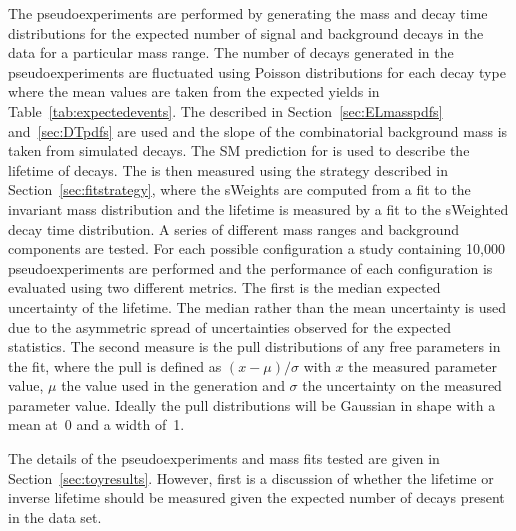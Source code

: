 The pseudoexperiments are performed by generating the mass and decay time distributions for the expected number of signal and background decays in the data for a particular mass range. The number of decays generated in the pseudoexperiments are fluctuated using Poisson distributions for each decay type where the mean values are taken from the expected yields in Table~\ref{tab:expectedevents}. The \pdfs described in Section~\ref{sec:ELmasspdfs} and~\ref{sec:DTpdfs} are used and the slope of the combinatorial background mass \pdf is taken from simulated \bbbarmumux decays. The SM prediction for \tmumu is used to describe the lifetime of \bsmumu decays.
The \el is then measured using the strategy described in Section~\ref{sec:fitstrategy}, where the sWeights are computed from a fit to the invariant mass distribution and the lifetime is measured by a fit to the sWeighted decay time distribution. A series of different mass ranges and background components are tested. For each possible configuration a study containing 10,000 pseudoexperiments are performed and the performance of each configuration is evaluated using two different metrics. The first is the median expected uncertainty of the \bsmumu lifetime. The median rather than the mean uncertainty is used due to the asymmetric spread of uncertainties observed for the expected statistics. The second measure is the pull distributions of any free parameters in the fit, where the pull is defined as $(x - \mu)/\sigma$ with $x$ the measured parameter value, $\mu$ the value used in the generation and $\sigma$ the uncertainty on the measured parameter value. Ideally the pull distributions will be Gaussian in shape with a mean at~0 and a width of~1.

 The details of the pseudoexperiments and mass fits tested are given in Section~\ref{sec:toyresults}. However, first is a discussion of whether the lifetime or inverse lifetime should be measured given the expected number of decays present in the data set.  

